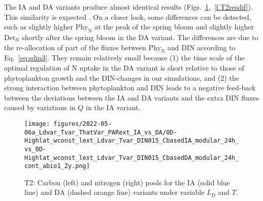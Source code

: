 \documentclass[gmd, manuscript]{copernicus}
\newcommand{\onur}[1]{\textcolor{blue}{\{Onur: #1\}}}
\newcommand{\markus}[1]{\textcolor{blue}{\{Markus: #1\}}}
\begin{document}

The IA and DA variants produce almost identical results (Figs.~\ref{f.T2res},~\ref{f.T2resdif}). This similarity is expected \citep{Ward2017}. On a closer look, some differences can be detected, such as slightly higher $\text{Phy}_{\text{N}}$ at the peak of the spring bloom and slightly higher $\text{Det}_{\text{N}}$ shortly after the spring bloom in the DA variant.  The differences are due to the re-allocation of part of the fluxes between $\text{Phy}_{\text{N}}$ and DIN according to Eq.~\eqref{eq:sdin3}.  They remain relatively small because (1) the time scale of the optimal regulation of N uptake in the DA variant is short relative to those of phytoplankton growth and the DIN-changes in our simulations, and (2) the strong interaction between phytoplankton and DIN leads to a negative feed-back between the deviations between the IA and DA variants and the extra DIN fluxes caused by variations in $Q$ in the IA variant.

\begin{figure}[htb!]
\texttt{[image: figures/2022-05-06a\_Ldvar\_Tvar\_ThatVar\_PARext\_IA\_vs\_DA/0D-Highlat\_wconst\_lext\_Ldvar\_Tvar\_DIN015\_CbasedIA\_modular\_24h\_vs\_0D-Highlat\_wconst\_lext\_Ldvar\_Tvar\_DIN015\_CbasedDA\_modular\_24h\_cont\_abio1\_2y.png]}
\caption{T2: Carbon (left) and nitrogen (right) pools for the IA (solid blue line) and DA (dashed orange line) variants under variable $L_{\text{D}}$ and $T$. 
\label{f.T2res}}
\end{figure}
\end{document}
